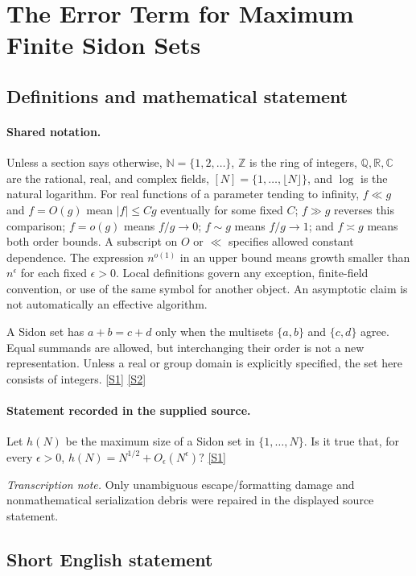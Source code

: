 \documentclass[11pt,a4paper]{article}
\newcommand{\N}{\mathbb{N}}
\newcommand{\Z}{\mathbb{Z}}
\newcommand{\Q}{\mathbb{Q}}
\newcommand{\R}{\mathbb{R}}
\newcommand{\C}{\mathbb{C}}
\newcommand{\sref}[2]{\hyperlink{source:#1:#2}{[S#2]}}
\begin{document}
\section{The Error Term for Maximum Finite Sidon Sets}\label{statement}


\subsection{Definitions and mathematical statement}

\paragraph{Shared notation.}Unless a section says otherwise, $\N=\{1,2,\ldots\}$,
$\Z$ is the ring of integers, $\Q,\R,\C$ are the rational, real, and complex
fields, $[N]=\{1,\ldots,\lfloor N\rfloor\}$, and $\log$ is the natural
logarithm. For real functions of a parameter tending to infinity,
$f\ll g$ and $f=O(g)$ mean $|f|\leq Cg$ eventually for some fixed $C$;
$f\gg g$ reverses this comparison; $f=o(g)$ means $f/g\to0$;
$f\sim g$ means $f/g\to1$; and $f\asymp g$ means both order bounds.
A subscript on $O$ or $\ll$ specifies allowed constant dependence.
The expression $n^{o(1)}$ in an upper bound means growth smaller than
$n^\epsilon$ for each fixed $\epsilon>0$. Local definitions govern any
exception, finite-field convention, or use of the same symbol for another
object. An asymptotic claim is not automatically an effective algorithm.



A Sidon set has $a+b=c+d$ only when the multisets $\{a,b\}$ and $\{c,d\}$ agree. Equal summands are allowed, but interchanging their order is not a new representation. Unless a real or group domain is explicitly specified, the set here consists of integers. \sref{statement}{1} \sref{statement}{2}

\paragraph{Statement recorded in the supplied source.}
Let $h(N)$ be the maximum size of a Sidon set in $\{1,\ldots,N\}$. Is it true that, for every $\epsilon>0$, $ h(N) = N^{1/2}+O_\epsilon(N^\epsilon)? $ \sref{statement}{1}

{\small\emph{Transcription note.} Only unambiguous escape/formatting damage and nonmathematical serialization debris were repaired in the displayed source statement.}

\subsection{Short English statement}
\end{document}
